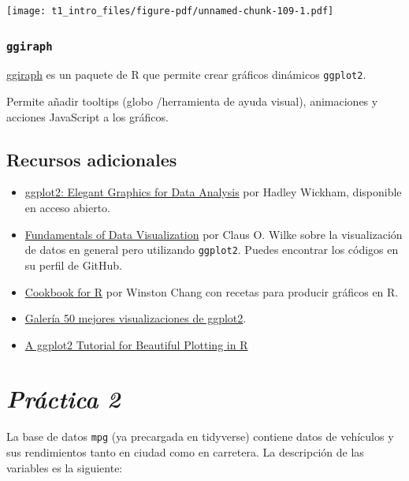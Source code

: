 \documentclass[
  letterpaper,
  DIV=11,
  numbers=noendperiod]{scrreprt}
\begin{document}
\texttt{[image: t1\_intro\_files/figure-pdf/unnamed-chunk-109-1.pdf]}

\subsubsection{\texorpdfstring{\texttt{ggiraph}}{ggiraph}}\label{ggiraph}

\href{https://davidgohel.github.io/ggiraph/index.html}{ggiraph} es un
paquete de R que permite crear gráficos dinámicos \texttt{ggplot2}.

Permite añadir tooltips (globo /herramienta de ayuda visual),
animaciones y acciones JavaScript a los gráficos.

\subsection{Recursos adicionales}\label{recursos-adicionales}

\begin{itemize}
\item
  \href{https://ggplot2-book.org/}{ggplot2: Elegant Graphics for Data
  Analysis} por Hadley Wickham, disponible en acceso abierto.
\item
  \href{https://clauswilke.com/dataviz/}{Fundamentals of Data
  Visualization} por Claus O. Wilke sobre la visualización de datos en
  general pero utilizando \texttt{ggplot2}. Puedes encontrar los códigos
  en su perfil de GitHub.
\item
  \href{http://www.cookbook-r.com/Graphs/}{Cookbook for R} por Winston
  Chang con recetas para producir gráficos en R.
\item
  \href{http://r-statistics.co/Top50-Ggplot2-Visualizations-MasterList-R-Code.html}{Galería
  50 mejores visualizaciones de ggplot2}.
\item
  \href{https://cedricscherer.netlify.app/2019/08/05/a-ggplot2-tutorial-for-beautiful-plotting-in-r/}{A
  ggplot2 Tutorial for Beautiful Plotting in R}
\end{itemize}

\section{\texorpdfstring{{\emph{Práctica
2}}}{Práctica 2}}\label{pruxe1ctica-2}

La base de datos \texttt{mpg} (ya precargada en tidyverse) contiene
datos de vehículos y sus rendimientos tanto en ciudad como en carretera.
La descripción de las variables es la siguiente:
\end{document}
